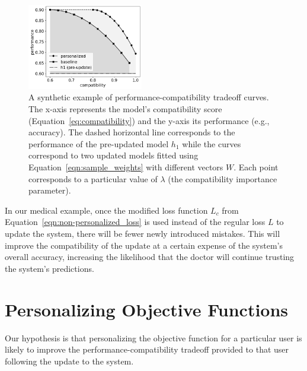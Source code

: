 \documentclass[letterpaper]{article} %
\theoremstyle{definition}
\begin{document}
\begin{figure}[t]
\centering
\includegraphics[width=0.45\textwidth]{example_tradeoff}
\caption{A synthetic example of performance-compatibility tradeoff curves. The x-axis represents the model's compatibility score (Equation~\ref{eq:compatibility}) and the y-axis its performance (e.g., accuracy). The dashed horizontal line corresponds to the performance of the pre-updated model $h_1$ while the curves correspond to two updated models fitted using Equation~\ref{eqn:sample_weights} with different vectors $W$. Each point corresponds to a particular value of $\lambda$ (the compatibility importance parameter).
}
\label{fig:example_tradeoff}
\end{figure}
In our medical example, once the modified loss function $L_c$ from Equation~\ref{eqn:non-personalized_loss} is used instead of the regular loss $L$ to update the system, there will be fewer newly introduced mistakes. This will improve the compatibility of the update at a certain expense of the system's overall accuracy, increasing the likelihood that the doctor will continue trusting the system's predictions.
\section{Personalizing Objective Functions}
\label{sec:personalization}

Our hypothesis is that personalizing the objective function for a particular user is likely to improve the performance-compatibility tradeoff provided to that user following the update to the system.
\end{document}
